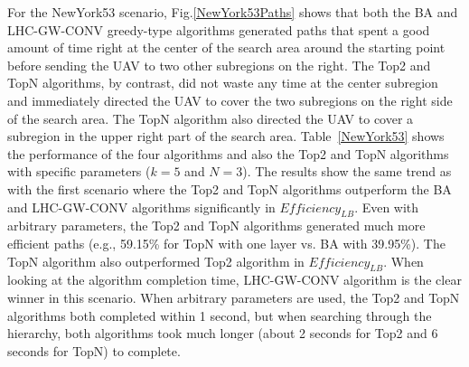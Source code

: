 \documentclass[journal]{IEEEtran}
\begin{document}
For the NewYork53 scenario, Fig.\ref{NewYork53Paths} shows that both the BA and LHC-GW-CONV greedy-type algorithms generated paths that spent a good amount of time right at the center of the search area around the starting point before sending the UAV to two other subregions on the right. The Top2 and TopN algorithms, by contrast, did not waste any time at the center subregion and immediately directed the UAV to cover the two subregions on the right side of the search area. The TopN algorithm also directed the UAV to cover a subregion in the upper right part of the search area. Table~\ref{NewYork53} shows the performance of the four algorithms and also the Top2 and TopN algorithms with specific parameters ($k=5$ and $N=3$). The results show the same trend as with the first scenario where the Top2 and TopN algorithms outperform the BA and LHC-GW-CONV algorithms significantly in $\mathit{Efficiency_{LB}}$. Even with arbitrary parameters, the Top2 and TopN algorithms generated much more efficient paths (e.g., 59.15\% for TopN with one layer vs. BA with 39.95\%). The TopN algorithm also outperformed Top2 algorithm in $\mathit{Efficiency_{LB}}$. When looking at the algorithm completion time, LHC-GW-CONV algorithm is the clear winner in this scenario. When arbitrary parameters are used, the Top2 and TopN algorithms both completed within 1 second, but when searching through the hierarchy, both algorithms took much longer (about 2 seconds for Top2 and 6 seconds for TopN) to complete.

\end{document}
